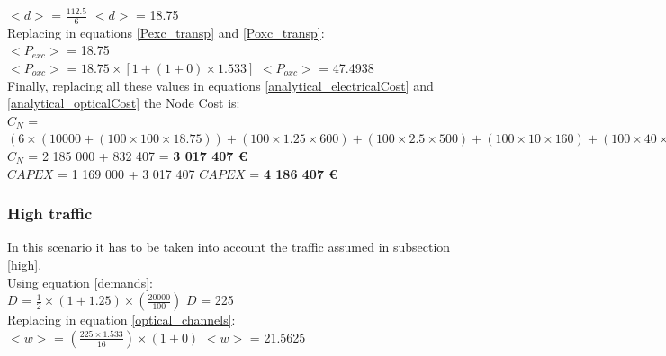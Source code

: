 $<d>$ = $\frac{112.5}{6}$ \qquad \qquad $<d>$ = 18.75\\

Replacing in equations \ref{Pexc_transp} and \ref{Poxc_transp}:\\

$<P_{exc}>$ = 18.75\\

$<P_{oxc}>$ = $18.75 \times [1 + (1 + 0 ) \times 1.533]$ \qquad \quad $<P_{oxc}>$ = 47.4938 \\

Finally, replacing all these values in equations \ref{analytical_electricalCost} and \ref{analytical_opticalCost} the Node Cost is:\\


$C_N$ = $(6 \times (10 000 + (1 00 \times 100 \times 18.75)) + (100 \times 1.25 \times 600) + (100 \times 2.5 \times 500) + (100 \times 10 \times 160) + (100 \times 40 \times 60) + (100 \times 100 \times 40)) + (6 \times (20 000 + (2 500 \times 47.4938 )))$\\

$C_N$ = 2 185 000 + 832 407 = \textbf{3 017 407 \euro}\\

$CAPEX$ = 1 169 000 + 3 017 407 \qquad \qquad $CAPEX$ = \textbf{4 186 407 \euro}\\

\subsubsection{High traffic}
\vspace{11pt}
In this scenario it has to be taken into account the traffic assumed in subsection \ref{high}.\\

Using equation \ref{demands}:\\

$D$ = ${\frac{1}{2}} \times {( 1 + 1.25 )} \times ( \frac{20000}{100} )$ \qquad \qquad $D$ = 225\\

Replacing in equation \ref{optical_channels}:\\

$<w>$ = $(\frac{225 \times 1.533}{16} ) \times ( 1 + 0)$ \qquad \qquad $<w>$ = 21.5625\\

